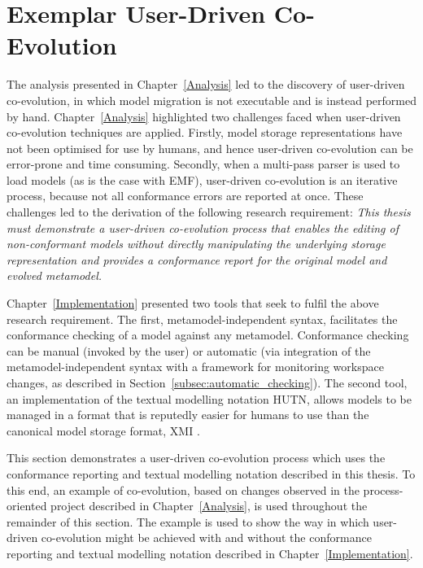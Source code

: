 
\section{Exemplar User-Driven Co-Evolution}
\label{sec:exemplar_user-driven_co-evo}
The analysis presented in Chapter~\ref{Analysis} led to the discovery of user-driven co-evolution, in which model migration is not executable and is instead performed by hand. Chapter~\ref{Analysis} highlighted two challenges faced when user-driven co-evolution techniques are applied. Firstly, model storage representations have not been optimised for use by humans, and hence user-driven co-evolution can be error-prone and time consuming. Secondly, when a multi-pass parser is used to load models (as is the case with EMF), user-driven co-evolution is an iterative process, because not all conformance errors are reported at once. These challenges led to the derivation of the following research requirement: \emph{This thesis must demonstrate a user-driven co-evolution process that enables the editing of non-conformant models without directly manipulating the underlying storage representation and provides a conformance report for the original model and evolved metamodel.}

Chapter~\ref{Implementation} presented two tools that seek to fulfil the above research requirement. The first, metamodel-independent syntax, facilitates the conformance checking of a model against any metamodel. Conformance checking can be manual (invoked by the user) or automatic (via integration of the metamodel-independent syntax with a framework for monitoring workspace changes, as described in Section~\ref{subsec:automatic_checking}). The second tool, an implementation of the textual modelling notation HUTN, allows models to be managed in a format that is reputedly easier for humans to use than the canonical model storage format, XMI \cite{hutn}.

This section demonstrates a user-driven co-evolution process which uses the conformance reporting and textual modelling notation described in this thesis. To this end, an example of co-evolution, based on changes observed in the process-oriented project described in Chapter~\ref{Analysis}, is used throughout the remainder of this section. The example is used to show the way in which user-driven co-evolution might be achieved with and without the conformance reporting and textual modelling notation described in Chapter~\ref{Implementation}.

